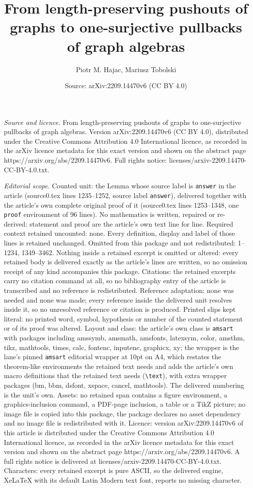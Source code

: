 \documentclass[10pt,a4paper]{amsart}
\title[From length-preserving pushouts of graphs to one-surjective ]{From length-preserving pushouts of graphs to one-surjective pullbacks of graph algebras}
\author{Piotr M. Hajac, Mariusz Tobolski}
\date{Source: arXiv:2209.14470v6 (CC BY 4.0)}
\begin{document}
\maketitle

\noindent\emph{Source and licence.} From length-preserving pushouts of graphs to one-surjective pullbacks of graph algebras. Version arXiv:2209.14470v6 (CC BY 4.0), distributed under the Creative Commons Attribution 4.0 International licence, as recorded in the arXiv licence metadata for this exact version and shown on the abstract page https://arxiv.org/abs/2209.14470v6. Full rights notice: licenses/arxiv-2209.14470-CC-BY-4.0.txt.\par\smallskip

\noindent\textit{Editorial scope.} Counted unit: the Lemma whose source label is \texttt{answer} in the article (source0.tex lines 1235--1252, source label \texttt{answer}), delivered together with the article's own complete original proof of it (source0.tex lines 1253--1348, one \texttt{proof} environment of 96 lines). No mathematics is written, repaired or re-derived: statement and proof are the article's own text line for line. Required context retained uncounted: none. Every definition, display and label of those lines is retained unchanged. Omitted from this package and not redistributed: 1--1234, 1349--3462. Nothing inside a retained excerpt is omitted or altered: every retained body is delivered exactly as the article's lines are written, so no omission receipt of any kind accompanies this package. Citations: the retained excerpts carry no citation command at all, so no bibliography entry of the article is transcribed and no reference is redistributed. Reference adaptation: none was needed and none was made; every reference inside the delivered unit resolves inside it, so no unresolved reference or citation is produced. Printed slips kept literal: no printed word, symbol, hypothesis or number of the counted statement or of its proof was altered. Layout and class: the article's own class is \texttt{amsart} with packages including amssymb, amsmath, amsfonts, latexsym, color, amsthm, tikz, mathtools, times, calc, fontenc, inputenc, graphicx, xy; the wrapper is the lane's pinned \texttt{amsart} editorial wrapper at 10pt on A4, which restates the theorem-like environments the retained text needs and adds the article's own macro definitions that the retained text needs (\texttt{\textbackslash text}), with extra wrapper packages (bm, bbm, dsfont, xspace, cancel, mathtools). The delivered numbering is the unit's own. Assets: no retained span contains a figure environment, a graphics-inclusion command, a PDF-page inclusion, a table or a TikZ picture; no image file is copied into this package, the package declares no asset dependency and no image file is redistributed with it. Licence: version arXiv:2209.14470v6 of this article is distributed under the Creative Commons Attribution 4.0 International licence, as recorded in the arXiv licence metadata for this exact version and shown on the abstract page https://arxiv.org/abs/2209.14470v6. A full rights notice is delivered at licenses/arxiv-2209.14470-CC-BY-4.0.txt. Characters: every retained excerpt is pure ASCII, so the delivered engine, XeLaTeX with its default Latin Modern text font, reports no missing character.
\end{document}
